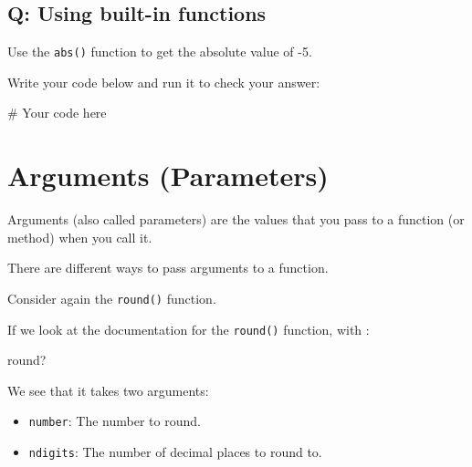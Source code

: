 \documentclass[
  letterpaper,
  DIV=11,
  numbers=noendperiod]{scrreprt}
\newenvironment{Shaded}{\begin{snugshade}}{\end{snugshade}}
\newcommand{\BuiltInTok}[1]{\textcolor[rgb]{0.00,0.23,0.31}{#1}}
\newcommand{\CommentTok}[1]{\textcolor[rgb]{0.37,0.37,0.37}{#1}}
\newcommand{\NormalTok}[1]{\textcolor[rgb]{0.00,0.23,0.31}{#1}}
\providecommand{\tightlist}{%
  \setlength{\itemsep}{0pt}\setlength{\parskip}{0pt}}\usepackage{longtable,booktabs,array}
\begin{document}
\begin{tcolorbox}[enhanced jigsaw, colframe=quarto-callout-tip-color-frame, opacityback=0, titlerule=0mm, bottomrule=.15mm, breakable, leftrule=.75mm, colbacktitle=quarto-callout-tip-color!10!white, title=\textcolor{quarto-callout-tip-color}{\faLightbulb}\hspace{0.5em}{Practice}, rightrule=.15mm, coltitle=black, opacitybacktitle=0.6, colback=white, left=2mm, arc=.35mm, toptitle=1mm, bottomtitle=1mm, toprule=.15mm]

\subsection{Q: Using built-in
functions}\label{q-using-built-in-functions}

Use the \texttt{abs()} function to get the absolute value of -5.

Write your code below and run it to check your answer:

\begin{Shaded}
\begin{Highlighting}[]
\CommentTok{\# Your code here}
\end{Highlighting}
\end{Shaded}

\end{tcolorbox}

\section{Arguments (Parameters)}\label{arguments-parameters}

Arguments (also called parameters) are the values that you pass to a
function (or method) when you call it.

There are different ways to pass arguments to a function.

Consider again the \texttt{round()} function.

If we look at the documentation for the \texttt{round()} function, with
:

\begin{Shaded}
\begin{Highlighting}[]
\BuiltInTok{round}\NormalTok{?}
\end{Highlighting}
\end{Shaded}

We see that it takes two arguments:

\begin{itemize}
\tightlist
\item
  \texttt{number}: The number to round.
\item
  \texttt{ndigits}: The number of decimal places to round to.
\end{itemize}
\end{document}
